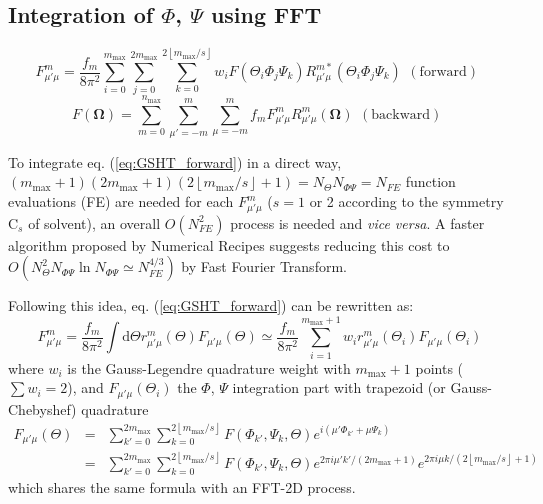 \subsection{Integration of $\Phi$, $\Psi$ using FFT}

\[
F_{\mu'\mu}^{m}=\frac{f_{m}}{8\pi^{2}}\sum_{i=0}^{m_{\mathrm{max}}}\sum_{j=0}^{2m_{\mathrm{max}}}\sum_{k=0}^{2\left\lfloor m_{\mathrm{max}}/s\right\rfloor }w_{i}F(\Theta_{i}\Phi_{j}\Psi_{k})R_{\mu'\mu}^{m*}(\Theta_{i}\Phi_{j}\Psi_{k})\begin{array}{c}
\mathrm{(forward)}\end{array}
\]
\[
F(\mathbf{\Omega})=\sum_{m=0}^{n_{\mathrm{max}}}\sum_{\mu'=-m}^{m}\sum_{\mu=-m}^{m}f_{m}F_{\mu'\mu}^{m}R_{\mu'\mu}^{m}(\mathbf{\Omega})\begin{array}{c}
\mathrm{(backward)}\end{array}
\]


To integrate eq. (\ref{eq:GSHT_forward}) in a direct way, $(m_{\mathrm{max}}+1)(2m_{\mathrm{max}}+1)(2\left\lfloor m_{\mathrm{max}}/s\right\rfloor +1)=N_{\Theta}N_{\Phi\Psi}=N_{FE}$
function evaluations (FE) are needed for each $F_{\mu'\mu}^{m}$ ($s=1$
or 2 according to the symmetry $\mathrm{C}_{s}$ of solvent), an overall
$O(N_{FE}^{2})$ process is needed and \textit{vice versa}. A faster
algorithm proposed by Numerical Recipes \citep{Numerical_Recipes_3ed}
suggests reducing this cost to $O(N_{\Theta}^{2}N_{\Phi\Psi}\ln N_{\Phi\Psi}\simeq N_{FE}^{4/3})$
by Fast Fourier Transform.

Following this idea, eq. (\ref{eq:GSHT_forward}) can be rewritten
as:
\begin{equation}
F_{\mu'\mu}^{m}=\frac{f_{m}}{8\pi^{2}}\int\mathrm{d}\Theta r_{\mu'\mu}^{m}(\Theta)F_{\mu'\mu}(\Theta)\simeq\frac{f_{m}}{8\pi^{2}}\sum_{i=1}^{m_{\mathrm{max}}+1}w_{i}r_{\mu'\mu}^{m}(\Theta_{i})F_{\mu'\mu}(\Theta_{i})
\end{equation}
where $w_{i}$ is the Gauss-Legendre quadrature weight with $m_{\mathrm{max}}+1$
points ($\sum w_{i}=2$), and $F_{\mu'\mu}(\Theta_{i})$ the $\Phi$,
$\Psi$ integration part with trapezoid (or Gauss-Chebyshef) quadrature
\begin{eqnarray}
F_{\mu'\mu}(\Theta) & = & \sum_{k'=0}^{2m_{\mathrm{max}}}\sum_{k=0}^{2\left\lfloor m_{\mathrm{max}}/s\right\rfloor }F(\Phi_{k'},\Psi_{k},\Theta)e^{i(\mu'\Phi_{k'}+\mu\Psi_{k})}\label{eq:f_mup_mu}\\
 & = & \sum_{k'=0}^{2m_{\mathrm{max}}}\sum_{k=0}^{2\left\lfloor m_{\mathrm{max}}/s\right\rfloor }F(\Phi_{k'},\Psi_{k},\Theta)e^{2\pi i\mu'k'/(2m_{\mathrm{max}}+1)}e^{2\pi i\mu k/(2\left\lfloor m_{\mathrm{max}}/s\right\rfloor +1)}\nonumber 
\end{eqnarray}
which shares the same formula with an FFT-2D process.


